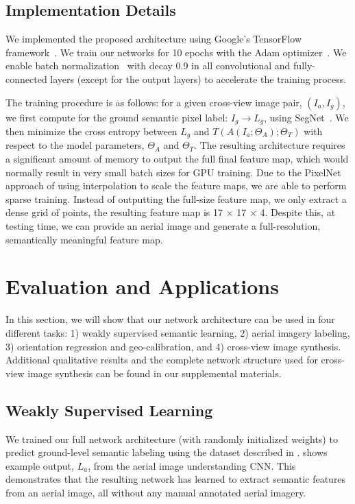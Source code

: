 \subsection{Implementation Details}
\label{sec:details}

We implemented the proposed architecture using Google's TensorFlow
framework~\cite{abadi2016tensorflow}. We train our networks for 10
epochs with the Adam optimizer~\cite{kingma2014adam}. We enable batch
normalization~\cite{ioffe2015batch} with decay 0.9 in all convolutional and 
fully-connected layers (except for the output layers) to accelerate
the training process. 

The training procedure is as follows: for a given cross-view image
pair, $(I_a, I_g)$, we first compute for the ground semantic pixel
label: $I_g \rightarrow L_g$, using
SegNet~\cite{badrinarayanan2015segnet}. We then minimize the cross
entropy between $L_g$ and $T(A(I_a;\Theta_A);\Theta_T)$ with respect
to the model parameters, $\Theta_A$ and $\Theta_T$.  The resulting
architecture requires a significant amount of memory to output the
full final feature map, which would normally result in very small
batch sizes for GPU training.  Due to the PixelNet approach of using
interpolation to scale the feature maps, we are able to perform sparse
training. Instead of outputting the full-size feature map, we only
extract a dense grid of points, the resulting feature map is 17
$\times$ 17 $\times$ 4.  Despite this, at testing time,  we can provide
an aerial image and generate a full-resolution, semantically meaningful
feature map.

\section{Evaluation and Applications}
In this section, we will show that our network architecture can be
used in four different tasks: 1) weakly supervised semantic learning, 
2) aerial imagery labeling, 3) orientation regression and geo-calibration, 
and 4) cross-view image synthesis. Additional qualitative results and 
the complete network structure used for cross-view image synthesis 
can be found in our supplemental materials.

\subsection{Weakly Supervised Learning}
\label{sec:transfer}

We trained our full network architecture (with randomly initialized
weights) to predict ground-level semantic labeling using the dataset
described in .   shows example output,
$L_a$, from the aerial image understanding CNN. This demonstrates that
the resulting network has learned to extract semantic features from an
aerial image, all without any manual annotated aerial imagery.

